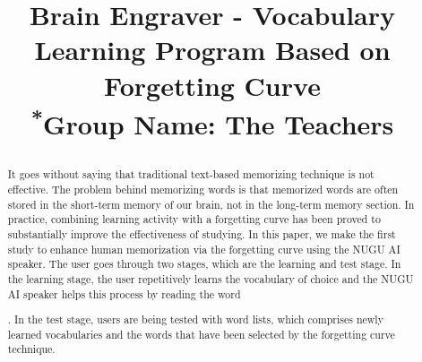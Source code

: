 \documentclass[conference]{IEEEtran}
\begin{document}
\title{Brain Engraver - Vocabulary Learning Program Based on Forgetting Curve\\
{\footnotesize \textsuperscript{*}Group Name: The Teachers}

}

\author{
\and
{}
\and
{}
\and
{}
}

\maketitle

\begin{abstract}
It goes without saying that traditional text-based memorizing technique is not effective. The problem behind memorizing words is that memorized words are often stored in the short-term memory of our brain, not in the long-term memory section. In practice, combining learning activity with a forgetting curve has been proved to substantially improve the effectiveness of studying. In this paper, we make the first study to enhance human memorization via the forgetting curve using the NUGU AI speaker. The user goes through two stages, which are the learning and test stage. In the learning stage, the user repetitively learns the vocabulary of choice and the NUGU AI speaker helps this process by reading the word . In the test stage, users are being tested with word lists, which comprises newly learned vocabularies and the words that have been selected by the forgetting curve technique.
\end{abstract}
\end{document}
